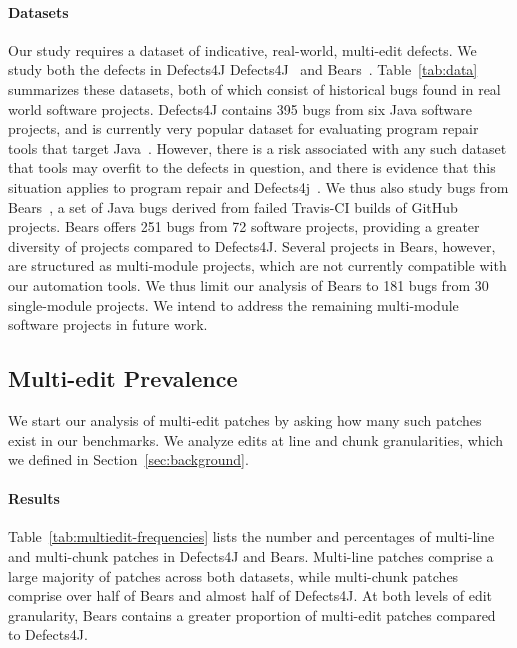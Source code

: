 \documentclass[sigconf, timestamp-false, anonymous=true]{acmart}
\begin{document}
\paragraph{Datasets}  Our study requires a dataset of indicative, real-world,
multi-edit defects.  We study both the defects in Defects4J
Defects4J~\cite{defects4j} and Bears~\cite{bears}.  Table~\ref{tab:data}
summarizes these datasets, both of which
consist of historical
bugs found in real world software projects. Defects4J contains 395 bugs from 
six Java software projects, and is currently very popular dataset for evaluating 
program repair tools that target Java~\cite{durieux-repair-them-all}.
However, there is a risk associated with any such dataset that tools may overfit
to the defects in question, and there is evidence that this situation applies to
program repair and Defects4j~\cite{durieux-repair-them-all}. 
We thus also study bugs from Bears~\cite{bears}, 
a set of Java bugs derived from failed Travis-CI builds of GitHub
projects. 
Bears offers 251 bugs from 72 software projects, providing a greater diversity of 
projects compared to Defects4J. 
Several projects in Bears, however, are structured as multi-module projects, 
which are not currently compatible with our automation tools.
We thus limit our analysis of Bears to 181 bugs from 30 single-module projects.
We intend to address the remaining multi-module software projects in future work.

\subsection{Multi-edit Prevalence}

We start our analysis of multi-edit patches by asking how many such patches 
exist in our benchmarks. We analyze edits at line and chunk granularities,
which we defined in Section~\ref{sec:background}.

\paragraph{Results} 
Table~\ref{tab:multiedit-frequencies} lists the number and percentages of
multi-line and multi-chunk patches in Defects4J and Bears. 
Multi-line patches comprise a large majority of patches across both datasets, 
while multi-chunk patches comprise over half of Bears and almost half of Defects4J.
At both levels of edit granularity, Bears contains a greater proportion of 
multi-edit patches compared to Defects4J.
\end{document}
